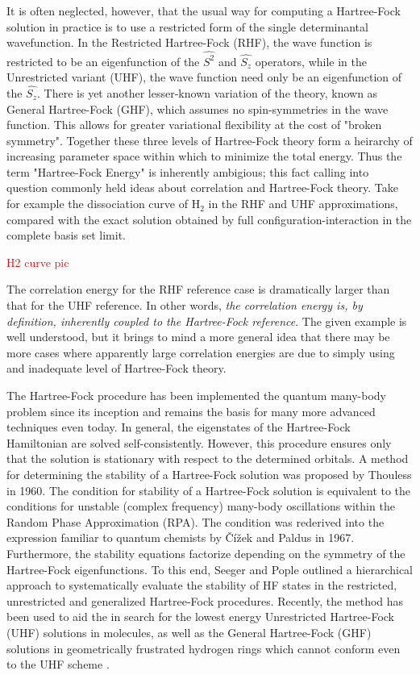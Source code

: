 \documentclass{revtex4}
\begin{document}
      It is often neglected, however, that the usual way for computing a Hartree-Fock solution in 
      practice
    is to use a restricted form of the single determinantal wavefunction. In the Restricted 
    Hartree-Fock (RHF), the wave function is restricted to be an eigenfunction of the $\hat{S^2}$ 
    and $\hat{S_z}$ 
    operators, while in the Unrestricted variant (UHF), the wave function need only be an 
    eigenfunction 
    of the $\hat{S_z}$. There is yet another lesser-known variation of the theory, known as General 
    Hartree-Fock (GHF), which assumes no spin-symmetries in the wave function. This allows for 
    greater
    variational flexibility at the cost of "broken symmetry". Together these three levels of 
    Hartree-Fock theory form a heirarchy of increasing parameter space within which to minimize the 
    total energy. Thus the term "Hartree-Fock Energy" is inherently ambigious; this fact calling 
    into question commonly held ideas about correlation and Hartree-Fock theory. Take for example 
    the dissociation curve of H$_2$ in the RHF and UHF approximations, compared with the exact 
    solution obtained by full configuration-interaction in the complete basis set limit. 
    
    \textcolor{red}{H2 curve pic}
    
    The correlation energy for the RHF reference case is dramatically larger than that for the UHF 
    reference. In other words, \emph{the correlation energy is, by definition, inherently coupled 
    to the 
    Hartree-Fock reference}. The given example is well understood, but it brings to mind a more 
    general idea that there may be more cases where apparently large correlation energies are due 
    to simply 
    using and inadequate level of Hartree-Fock theory.  
    
    
    
 
    The Hartree-Fock procedure has been implemented the quantum many-body problem since its inception and remains the basis for many more advanced techniques even today. In general, the eigenstates of the Hartree-Fock Hamiltonian are solved self-consistently. However, this procedure ensures only that the solution is stationary with respect to the determined orbitals. A method for determining the stability of a Hartree-Fock solution was proposed by Thouless in 1960\cite{Thouless1960}. The condition for stability of a Hartree-Fock solution is equivalent to the conditions for unstable (complex frequency) many-body oscillations within the Random Phase Approximation (RPA). The condition was rederived into the expression familiar to quantum chemists by Čížek and Paldus in 1967\cite{Cizek1967}. Furthermore, the stability equations factorize depending on the symmetry of the Hartree-Fock eigenfunctions. To this end, Seeger and Pople outlined a hierarchical approach to systematically evaluate the stability of HF states in the restricted, unrestricted and generalized Hartree-Fock procedures\cite{Seeger1977}. Recently, the method has been used to aid the in search for the lowest energy Unrestricted Hartree-Fock (UHF) solutions in molecules, as well as the General Hartree-Fock (GHF) solutions in geometrically frustrated hydrogen rings which cannot conform even to the UHF scheme \cite{Pulay2016}\cite{Goings2015}.
    
\end{document}

